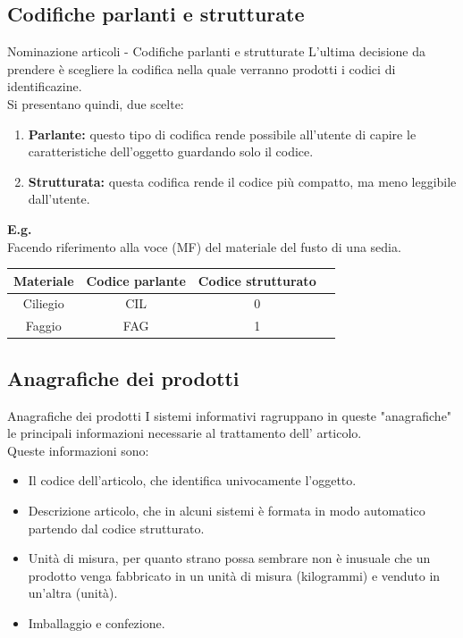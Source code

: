 \documentclass{beamer}
\begin{document}
\subsection{Codifiche parlanti e strutturate}
\begin{frame}{Nominazione articoli - Codifiche parlanti e strutturate}
    L'ultima decisione da prendere è scegliere la codifica nella quale verranno prodotti i codici di identificazine.\\
    Si presentano quindi, due scelte:
    \begin{enumerate}
        \item \textbf{Parlante:} questo tipo di codifica rende possibile all'utente di capire le caratteristiche dell'oggetto guardando solo il codice.
        \item \textbf{Strutturata:} questa codifica rende il codice più compatto, ma meno leggibile dall'utente.
    \end{enumerate}
    \textbf{E.g.}\\
    Facendo riferimento alla voce (MF) del materiale del fusto di una sedia.
    \begin{center}
        \begin{tabular}{|c|c|c|c|}
            \hline
            \textbf{Materiale} & \textbf{Codice parlante} & \textbf{Codice strutturato} \\
            \hline
            Ciliegio           & CIL                      & 0                           \\
            \hline
            Faggio              & FAG                      & 1                           \\
            \hline
        \end{tabular}
    \end{center}
\end{frame}

\subsection{Anagrafiche dei prodotti}
\begin{frame}{Anagrafiche dei prodotti}
    I sistemi informativi ragruppano in queste "anagrafiche" le principali informazioni necessarie al trattamento dell' articolo.\\
    Queste informazioni sono:
    \begin{itemize}
        \item Il codice dell'articolo, che identifica univocamente l'oggetto.
        \item Descrizione articolo, che in alcuni sistemi è formata in modo automatico partendo dal codice strutturato.
        \item Unità di misura, per quanto strano possa sembrare non è inusuale che un prodotto venga fabbricato in un unità di misura (kilogrammi) e venduto in un'altra (unità).
        \item Imballaggio e confezione.
    \end{itemize}
\end{frame}
\end{document}
